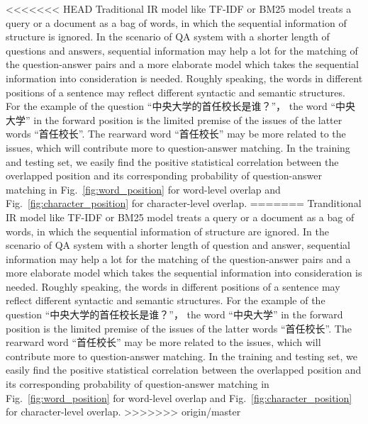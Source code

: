 \documentclass{llncs}
\begin{document}
\begin{table}[!htbp]
\begin{table}[!htbp]
<<<<<<< HEAD
Traditional IR model like TF-IDF or BM25 model treats a query or a document as a bag of words, in which the sequential information of structure is ignored. In the scenario of QA system with a shorter length of questions and answers, sequential information may help a lot for the matching of the question-answer pairs and a more elaborate model which takes the sequential information into consideration is needed. Roughly speaking, the words in different positions of a sentence may reflect different syntactic and semantic structures. For the example of the question ``中央大学的首任校长是谁？''， the word ``中央大学'' in the forward position is the limited premise of the issues of the latter words ``首任校长''.  The rearward word ``首任校长'' may be more related to the issues, which will contribute more to question-answer matching. In the training and testing set, we easily find the positive statistical correlation between the overlapped position and its corresponding probability of question-answer matching in Fig.~\ref{fig:word_position} for word-level overlap and Fig.~\ref{fig:character_position} for character-level overlap. 
=======
Tranditional IR model like TF-IDF or BM25 model treats a query or a document as a bag of words, in which the sequential information of structure are ignored. In the scenario of QA system with a shorter length of question and answer, sequential information may help a lot for the matching of the question-answer pairs and a more elaborate model which takes the sequential information into consideration is needed. Roughly speaking, the words in different positions of a sentence may reflect different syntactic and semantic structures. For the example of the question ``中央大学的首任校长是谁？''， the word ``中央大学'' in the forward position is the limited premise of the issues of the latter words ``首任校长''.  The rearward word ``首任校长'' may be more related to the issues, which will contribute more to question-answer matching. In the training and testing set, we easily find the positive statistical correlation between the overlapped position and its corresponding probability of question-answer matching in Fig.~\ref{fig:word_position} for word-level overlap and Fig.~\ref{fig:character_position} for character-level overlap. 
>>>>>>> origin/master




\end{table}
\end{table}
\end{document}

